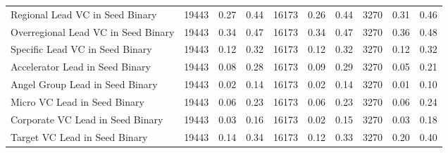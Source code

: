 \begin{table}[!h]
{\begin{tabular}[t]{lrrrrrrrrr}
Regional Lead VC in Seed Binary & 19443 & 0.27 & 0.44 & 16173 & 0.26 & 0.44 & 3270 & 0.31 & 0.46\\
Overregional Lead VC in Seed Binary & 19443 & 0.34 & 0.47 & 16173 & 0.34 & 0.47 & 3270 & 0.36 & 0.48\\
Specific Lead VC in Seed Binary & 19443 & 0.12 & 0.32 & 16173 & 0.12 & 0.32 & 3270 & 0.12 & 0.32\\
Accelerator Lead in Seed Binary & 19443 & 0.08 & 0.28 & 16173 & 0.09 & 0.29 & 3270 & 0.05 & 0.21\\
\addlinespace
Angel Group Lead in Seed Binary & 19443 & 0.02 & 0.14 & 16173 & 0.02 & 0.14 & 3270 & 0.01 & 0.10\\
Micro VC Lead in Seed Binary & 19443 & 0.06 & 0.23 & 16173 & 0.06 & 0.23 & 3270 & 0.06 & 0.24\\
Corporate VC Lead in Seed Binary & 19443 & 0.03 & 0.16 & 16173 & 0.02 & 0.15 & 3270 & 0.03 & 0.18\\
Target VC Lead in Seed Binary & 19443 & 0.14 & 0.34 & 16173 & 0.12 & 0.33 & 3270 & 0.20 & 0.40\\
\bottomrule
\end{tabular}}
\end{table}
